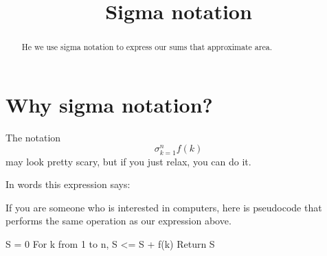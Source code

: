 \documentclass{ximera}
\title[Dig-In:]{Sigma notation}
\begin{document}
\begin{abstract}
  He we use sigma notation to express our sums that approximate area.
\end{abstract}
\maketitle

\section{Why sigma notation?}

The notation
\[
\sigma_{k = 1}^n f(k) 
\]
may look pretty scary, but if you just relax, you can do it.

In words this expression says:


If you are someone who is interested in computers, here is pseudocode
that performs the same operation as our expression above.

S = 0
For k from 1 to n,  S <= S + f(k)
Return S

\end{document}
